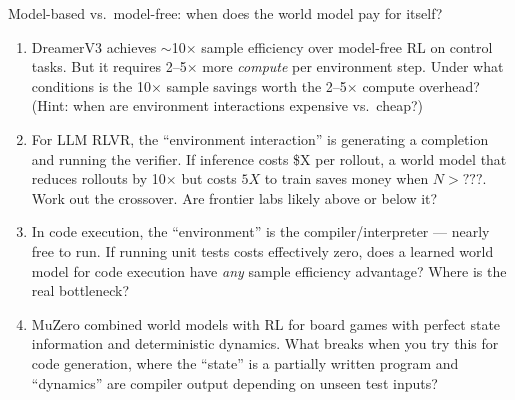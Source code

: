 \begin{thinkfirst}{Model-based vs.\ model-free: when does the world model pay for itself?}
\begin{enumerate}
  \item DreamerV3 achieves $\sim$10$\times$ sample efficiency over model-free RL on control tasks. But it requires 2--5$\times$ more \textit{compute} per environment step. Under what conditions is the 10$\times$ sample savings worth the 2--5$\times$ compute overhead? (Hint: when are environment interactions expensive vs.\ cheap?)

  \item For LLM RLVR, the ``environment interaction'' is generating a completion and running the verifier. If inference costs \$X per rollout, a world model that reduces rollouts by 10$\times$ but costs $5X$ to train saves money when $N > \text{???}$. Work out the crossover. Are frontier labs likely above or below it?

  \item In code execution, the ``environment'' is the compiler/interpreter --- nearly free to run. If running unit tests costs effectively zero, does a learned world model for code execution have \textit{any} sample efficiency advantage? Where is the real bottleneck?

  \item MuZero combined world models with RL for board games with perfect state information and deterministic dynamics. What breaks when you try this for code generation, where the ``state'' is a partially written program and ``dynamics'' are compiler output depending on unseen test inputs?
\end{enumerate}
\end{thinkfirst}

